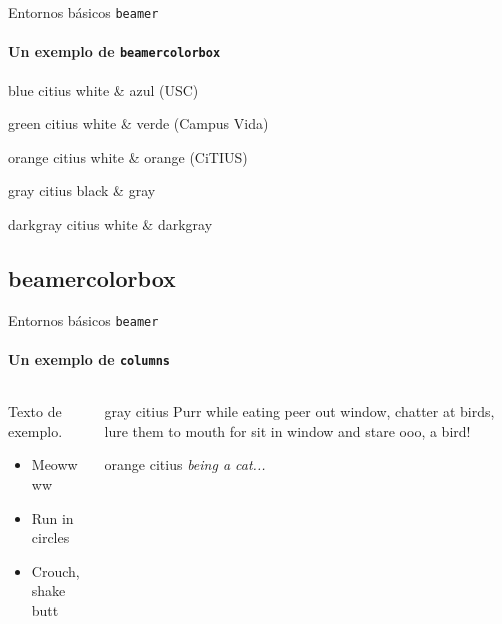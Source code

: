 \documentclass[11pt,aspectratio=169]{beamer}
\begin{document}
\begin{frame}{Entornos básicos \texttt{beamer}}
\framesubtitle{Un exemplo de \texttt{beamercolorbox}}


\begin{beamercolorbox}[sep=1ex]{blue citius}
  white \& azul (USC)
\end{beamercolorbox}

\begin{beamercolorbox}[sep=1ex]{green citius}
  white \& verde (Campus Vida)
\end{beamercolorbox}

\begin{beamercolorbox}[sep=1ex]{orange citius}
  white \& orange (CiTIUS)
\end{beamercolorbox}

\begin{beamercolorbox}[sep=1ex]{gray citius}
  black \& gray
\end{beamercolorbox}

\begin{beamercolorbox}[sep=1ex]{darkgray citius}
  white \& darkgray
\end{beamercolorbox}

\end{frame}


\subsection*{beamercolorbox}

\begin{frame}{Entornos básicos \texttt{beamer}}
\framesubtitle{Un exemplo de \texttt{columns}}
  \begin{columns}
  \begin{column}{0.5\textwidth}
    Texto de exemplo.\\
    \begin{itemize}
      \item Meowwww
      \item Run in circles
      \item Crouch, shake butt
    \end{itemize}
  \end{column}
  \begin{column}{0.5\textwidth}
    \begin{beamercolorbox}[sep=1ex]{gray citius}
      Purr while eating peer out window, chatter at birds, lure them to mouth
      for sit in window and stare ooo, a bird!
    \end{beamercolorbox}
    \begin{beamercolorbox}[sep=1ex]{orange citius}
      \textit{being a cat...}
    \end{beamercolorbox}
  \end{column}
\end{columns}
\end{frame}
\end{document}
